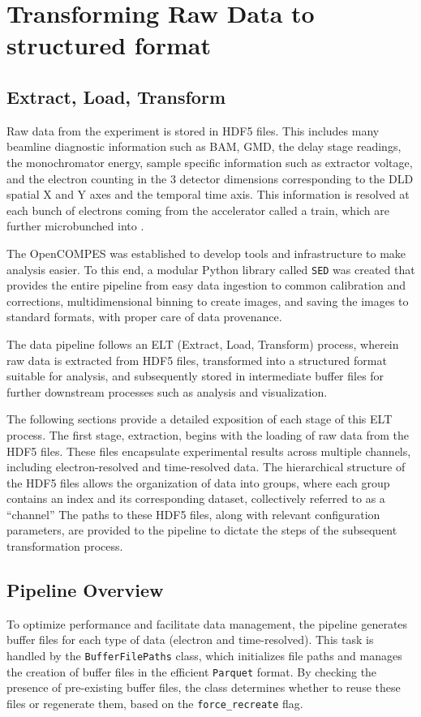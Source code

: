 \chapter{Transforming Raw Data to structured format}
\section*{Extract, Load, Transform}
Raw data from the experiment is stored in \gls{HDF5} files. This includes many \gls{beamline} diagnostic information such as \gls{BAM}, \gls{GMD}, the delay stage readings, the monochromator energy, sample specific information such as extractor voltage, and the electron counting in the 3 detector dimensions corresponding to the \gls{DLD} spatial X and Y axes and the temporal time axis. This information is resolved at each bunch of electrons coming from the accelerator called a \gls{train}, which are further microbunched into .

The \gls{OpenCOMPES} was established to develop tools and infrastructure to make analysis easier. To this end, a modular Python library called \texttt{\gls{SED}} was created that provides the entire pipeline from easy data ingestion to common calibration and corrections, multidimensional binning to create images, and saving the images to standard formats, with proper care of data provenance.

The data pipeline follows an ELT (Extract, Load, Transform) process, wherein raw data is extracted from \gls{HDF5} files, transformed into a structured format suitable for analysis, and subsequently stored in intermediate buffer files for further downstream processes such as analysis and visualization.

The following sections provide a detailed exposition of each stage of this ELT process. The first stage, extraction, begins with the loading of raw data from the \gls{HDF5} files. These files encapsulate experimental results across multiple channels, including electron-resolved and time-resolved data. The hierarchical structure of the \gls{HDF5} files allows the organization of data into groups, where each group contains an index and its corresponding dataset, collectively referred to as a “channel” The paths to these \gls{HDF5} files, along with relevant configuration parameters, are provided to the pipeline to dictate the steps of the subsequent transformation process.

\section*{Pipeline Overview}
To optimize performance and facilitate data management, the pipeline generates buffer files for each type of data (electron and time-resolved). This task is handled by the \texttt{BufferFilePaths} class, which initializes file paths and manages the creation of buffer files in the efficient \texttt{Parquet} format. By checking the presence of pre-existing buffer files, the class determines whether to reuse these files or regenerate them, based on the \texttt{force\_recreate} flag.

